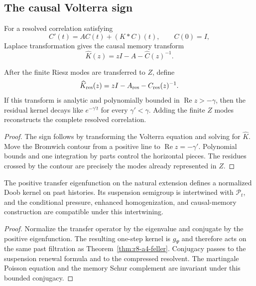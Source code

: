\subsection{The causal Volterra sign}

For a resolved correlation satisfying
\[
 C'(t)=AC(t)+(K*C)(t),\qquad C(0)=I,
\]
Laplace transformation gives the causal memory transform
\[
 \widehat K(z)=zI-A-\widehat C(z)^{-1}.
\]

\begin{theorem}
\label{thm:r8-a4-memory}
After the finite Riesz modes are transferred to $Z$, define
\[
 \widehat K_{\rm res}(z)=zI-A_{\rm res}-C_{\rm res}(z)^{-1}.
\]
If this transform is analytic and polynomially bounded in
$\operatorname{Re}z>-\gamma$, then the residual kernel decays like
$e^{-\gamma' t}$ for every $\gamma'<\gamma$.  Adding the finite $Z$ modes
reconstructs the complete resolved correlation.
\end{theorem}

\begin{proof}
The sign follows by transforming the Volterra equation and solving for
$\widehat K$.  Move the Bromwich contour from a positive line to
$\operatorname{Re}z=-\gamma'$.  Polynomial bounds and one integration by parts
control the horizontal pieces.  The residues crossed by the contour are
precisely the modes already represented in $Z$.
\end{proof}

\begin{theorem}
\label{thm:r8-a4-doob}
The positive transfer eigenfunction on the natural extension defines a
normalized Doob kernel on past histories.  Its suspension semigroup is
intertwined with $\mathcal P_t$, and the conditional pressure, enhanced
homogenization, and causal-memory construction are compatible under this
intertwining.
\end{theorem}

\begin{proof}
Normalize the transfer operator by the eigenvalue and conjugate by the positive
eigenfunction.  The resulting one-step kernel is $g_\Psi$ and therefore acts on
the same past filtration as Theorem~\ref{thm:r8-a4-feller}.  Conjugacy passes to
the suspension renewal formula and to the compressed resolvent.  The martingale
Poisson equation and the memory Schur complement are invariant under this
bounded conjugacy.
\end{proof}
